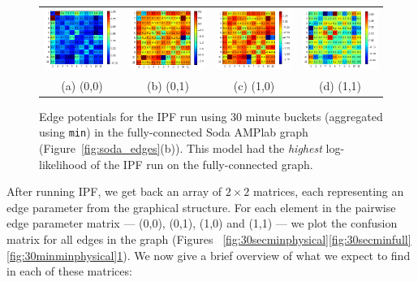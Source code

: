 \begin{figure}[ht]
\centering
\begin{tabular}{cccc}
\includegraphics[width=1.3in]{figs/30minmin00fullconf} & \includegraphics[width=1.3in]{figs/30minmin01fullconf} & \includegraphics[width=1.3in]{figs/30minmin10fullconf} & \includegraphics[width=1.3in]{figs/30minmin11fullconf} \\
(a) (0,0) & (b) (0,1) & (c) (1,0) & (d) (1,1) \\[6pt]
\end{tabular}
\caption{Edge potentials for the IPF run using 30 minute buckets (aggregated using \texttt{min}) in the fully-connected Soda AMPlab graph (Figure~\ref{fig:soda_edges}(b)). This model had the \emph{highest} log-likelihood of the IPF run on the fully-connected graph.}
\label{fig:30minminfull}
\end{figure}


After running IPF, we get back an array of $2\times 2$ matrices, each representing an edge parameter from the graphical structure.
For each element in the pairwise edge parameter matrix --- (0,0), (0,1), (1,0) and (1,1) --- we plot the confusion matrix for all edges in the graph (Figures ~\ref{fig:30secminphysical}\ref{fig:30secminfull}\ref{fig:30minminphysical}\ref{fig:30minminfull}).
We now give a brief overview of what we expect to find in each of these matrices:

